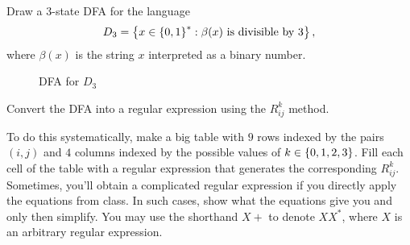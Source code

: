 \begin{problem}
  \begin{enumalph}
    \item Draw a $3$-state DFA for the language
    \[
      D_3 = \left\{ x \in \left\{0, 1\right\}^* :
      \beta(x) \text{ is divisible by } 3\right\},
    \]
    where $\beta(x)$ is the string $x$ interpreted as a
    binary number.
    \begin{Answer}
      \begin{figure}[H]
        \centering
        \caption{DFA for $D_3$}
      \end{figure}
    \end{Answer}
    \item Convert the DFA into a regular expression
      using the $R_{ij}^k$ method.

      \step
      To do this systematically,
      make a big table with $9$ rows indexed by the pairs $(i, j)$
      and $4$ columns indexed by the possible values of $k \in \left\{0, 1, 2, 3\right\}$.
      Fill each cell of the table with a regular expression that generates
      the corresponding $R_{ij}^k$.
      Sometimes, you’ll obtain a complicated regular expression if you directly
      apply the equations from class. In such cases, show what the equations give you
      and only then simplify. You may use the shorthand $X+$ to denote $XX^\ast$,
      where $X$ is an arbitrary regular expression.
      \begin{Answer}  

      \end{Answer}
  \end{enumalph}
\end{problem}
